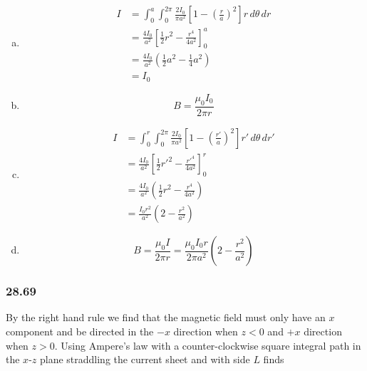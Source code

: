 \documentclass{article}
\begin{document}
\begin{enumerate}[(a)]
  \item

        \begin{align*}
          I & = \int_0^a \int_0^{2 \pi} \frac{2 I_0}{\pi a^2} \left[ 1 - \left( \frac{r}{a} \right)^2 \right] r \,d \theta \,dr \\
            & = \frac{4 I_0}{a^2} \left[ \frac{1}{2} r^2 - \frac{r^4}{4 a^2} \right]_0^a                                        \\
            & = \frac{4 I_0}{a^2} \left( \frac{1}{2} a^2 - \frac{1}{4} a^2 \right)                                              \\
            & = I_0
        \end{align*}

  \item \[B = \frac{\mu_0 I_0}{2 \pi r}\]

  \item

        \begin{align*}
          I & = \int_0^r \int_0^{2 \pi} \frac{2 I_0}{\pi a^2} \left[ 1 - \left( \frac{r'}{a} \right)^2 \right] r' \,d \theta \,dr' \\
            & = \frac{4 I_0}{a^2} \left[ \frac{1}{2} r'^2 - \frac{r'^4}{4 a^2} \right]_0^r                                         \\
            & = \frac{4 I_0}{a^2} \left( \frac{1}{2} r^2 - \frac{r^4}{4 a^2} \right)                                               \\
            & = \frac{I_0 r^2}{a^2} \left( 2 - \frac{r^2}{a^2} \right)
        \end{align*}

  \item \[B = \frac{\mu_0 I}{2 \pi r} = \frac{\mu_0 I_0 r}{2 \pi a^2} \left( 2 - \frac{r^2}{a^2} \right)\]
\end{enumerate}

\subsubsection{28.69}

By the right hand rule we find that the magnetic field must only have an $x$ component and be directed in the $-x$ direction when $z < 0$ and $+x$ direction when $z > 0$. Using Ampere's law with a counter-clockwise square integral path in the $x$-$z$ plane straddling the current sheet and with side $L$ finds
\end{document}
